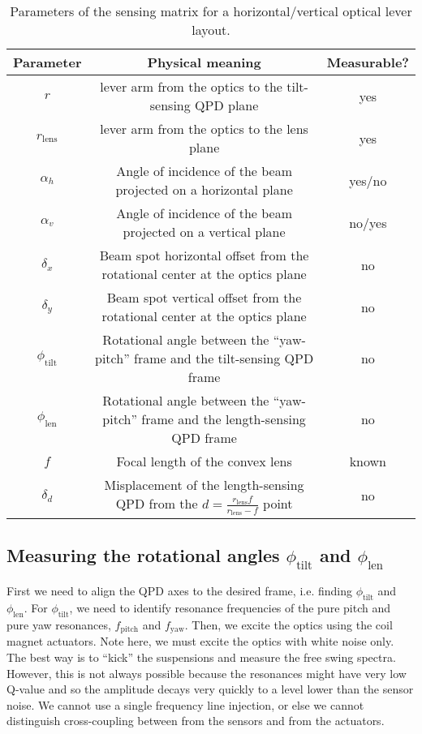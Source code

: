 \begin{table}[!h]
	\centering
	\begin{tabular}{|c|c|c|}
		\hline
		Parameter & Physical meaning & Measurable?\\
		\hline
		$r$ & lever arm from the optics to the tilt-sensing QPD plane & yes\\
		\hline
		$r_\mathrm{lens}$ & lever arm from the optics to the lens plane & yes\\
		\hline
		$\alpha_h$ & Angle of incidence of the beam projected on a horizontal plane & yes/no\\%
		\hline
		$\alpha_v$ &  Angle of incidence of the beam projected on a vertical plane & no/yes\\
		\hline
		$\delta_x$ & Beam spot horizontal offset from the rotational center at the optics plane & no\\
		\hline
		$\delta_y$ & Beam spot vertical offset from the rotational center at the optics plane & no\\
		\hline
		$\phi_\mathrm{tilt}$ & Rotational angle between the ``yaw-pitch'' frame and the tilt-sensing QPD frame & no\\
		\hline
		$\phi_\mathrm{len}$ & Rotational angle between the ``yaw-pitch'' frame and the length-sensing QPD frame & no\\
		\hline
		$f$ & Focal length of the convex lens & known\\
		\hline
		$\delta_d$ & Misplacement of the length-sensing QPD from the $d=\frac{r_\mathrm{lens}f}{r_\mathrm{lens}-f}$ point & no\\
		\hline
	\end{tabular}
	\caption{Parameters of the sensing matrix for a horizontal/vertical optical lever layout.}
	\label{table:sensing_matrix_parameters}	
\end{table}

\subsection{Measuring the rotational angles $\phi_\mathrm{tilt}$ and $\phi_\mathrm{len}$}
First we need to align the QPD axes to the desired frame, i.e. finding $\phi_\mathrm{tilt}$ and $\phi_\mathrm{len}$.
For $\phi_\mathrm{tilt}$, we need to identify resonance frequencies of the pure pitch and pure yaw resonances, $f_\mathrm{pitch}$ and $f_\mathrm{yaw}$.
Then, we excite the optics using the coil magnet actuators.
Note here, we must excite the optics with white noise only.
The best way is to ``kick'' the suspensions and measure the free swing spectra.
However, this is not always possible because the resonances might have very low Q-value and so the amplitude decays very quickly to a level lower than the sensor noise.
We cannot use a single frequency line injection, or else we cannot distinguish cross-coupling between from the sensors and from the actuators.


